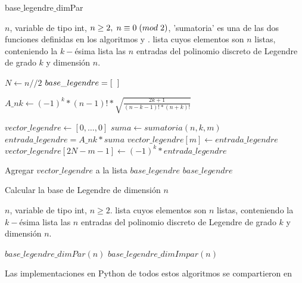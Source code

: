 \begin{algorithm}
\caption{base$\_$legendre$\_$dimPar}\label{alg: legendre par}
\begin{algorithmic} [1]
\REQUIRE $n$, variable de tipo int, $n \geq 2, \hspace{0.1cm} n \equiv 0 \hspace{0.1cm} (mod \hspace{0.1cm} 2)$, 'sumatoria' es una de las dos funciones definidas en los algoritmos
 y .
\ENSURE lista cuyos elementos son $n$ listas, conteniendo
la $k-$ésima lista las $n$ entradas del polinomio discreto de Legendre de
grado $k$ y dimensión $n$.


\STATE $N \leftarrow n//2$
\STATE $base\_legendre=[ \hspace{0.2cm} ]$

\STATE $A\_nk \leftarrow (-1)^{k}*(n-1)!*
\sqrt{\frac{
2k+1
}{
(n-k-1)!*(n+k)!
}}$

\STATE $vector\_legendre \leftarrow [ 0, \ldots , 0]$  
\STATE $suma \leftarrow sumatoria(n,k,m)$
\STATE $entrada\_legendre=A\_nk * suma$
\STATE $vector\_legendre[m] \leftarrow entrada\_legendre$ 
\STATE $vector\_legendre[2N-m-1] \leftarrow (-1)^{k}*entrada\_legendre$
\ENDFOR


\STATE Agregar $vector\_legendre$ a la lista $base\_legendre$
\ENDFOR
\RETURN $base\_legendre$
\end{algorithmic}
\end{algorithm}



\begin{algorithm}
\caption{Calcular la base de Legendre de dimensión $n$}\label{alg: legendre}
\begin{algorithmic} [1]
\REQUIRE $n$, variable de tipo int, $n \geq 2$.
\ENSURE lista cuyos elementos son $n$ listas, conteniendo
la $k-$ésima lista las $n$ entradas del polinomio discreto de Legendre de
grado $k$ y dimensión $n$.

\STATE $base\_legendre\_dimPar(n)$
\ELSE
\STATE $base\_legendre\_dimImpar(n)$
\ENDIF
\end{algorithmic}
\end{algorithm}


Las implementaciones en Python de todos estos algoritmos
se compartieron en 
